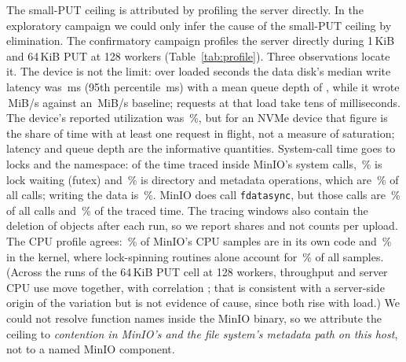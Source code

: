 \documentclass[review,12pt]{elsarticle}
\newcommand{\lab}[1]{\textsf{#1}}
\begin{document}
The small-PUT ceiling is attributed by profiling the server directly. In the exploratory campaign we could only infer
the cause of the small-PUT ceiling by elimination. The confirmatory campaign profiles the server
directly during 1\,KiB and 64\,KiB PUT at 128 workers (Table~\ref{tab:profile}). Three
observations locate it. The device is not the limit: over \RevProfDiskSeconds{} loaded
seconds the data disk's median write latency was \RevProfDiskAwait\,ms (95th percentile
\RevProfDiskAwaitPninetyfive\,ms) with a mean queue depth of \RevProfDiskQueue, while it wrote
\RevProfDiskWriteMib\,MiB/s against an \RevDiskWrite\,MiB/s baseline; requests at that load take
tens of milliseconds. The device's reported utilization was \RevProfDiskUtil\,\%, but for an
NVMe device that figure is the share of time with at least one request in flight, not a measure
of saturation; latency and queue depth are the informative quantities. System-call time goes to locks and the namespace: of the time traced
inside MinIO's system calls, \RevProfFutexTime\,\% is lock waiting (futex) and
\RevProfNamespaceTime\,\% is directory and metadata operations, which are
\RevProfNamespaceCalls\,\% of all calls; writing the data is \RevProfWriteTime\,\%. MinIO does
call \texttt{fdatasync}, but those calls are \RevProfSyncCalls\,\% of all calls and
\RevProfSyncTime\,\% of the traced time. The tracing windows also contain the deletion of
objects after each run, so we report shares and not counts per upload. The CPU profile agrees: \RevProfCpuUser\,\% of MinIO's CPU samples are in
its own code and \RevProfCpuKernel\,\% in the kernel, where lock-spinning routines alone account
for \RevProfCpuKernelLocks\,\% of all samples. (Across the \RevNoisyRuns{} runs of the 64\,KiB PUT
cell at 128 workers, throughput and server CPU use move together, with correlation
\RevNoisyCpuCorr; that is consistent with a server-side origin of the variation but is not
evidence of cause, since both rise with load.) We could not resolve function names inside the MinIO binary, so we attribute
the ceiling to \emph{contention in MinIO's and the file system's metadata path on this host}, not
to a named MinIO component.

\begin{table}[!htbp]
\caption{Where MinIO's system-call time goes during small-object PUT at 128 workers (\RevProfStraceCycles{} tracing windows, \lab{Profiling}). Runs under tracing are slowed and supply no performance numbers.}
\label{tab:profile}
\centering\footnotesize
{}
\end{table}
\end{document}
